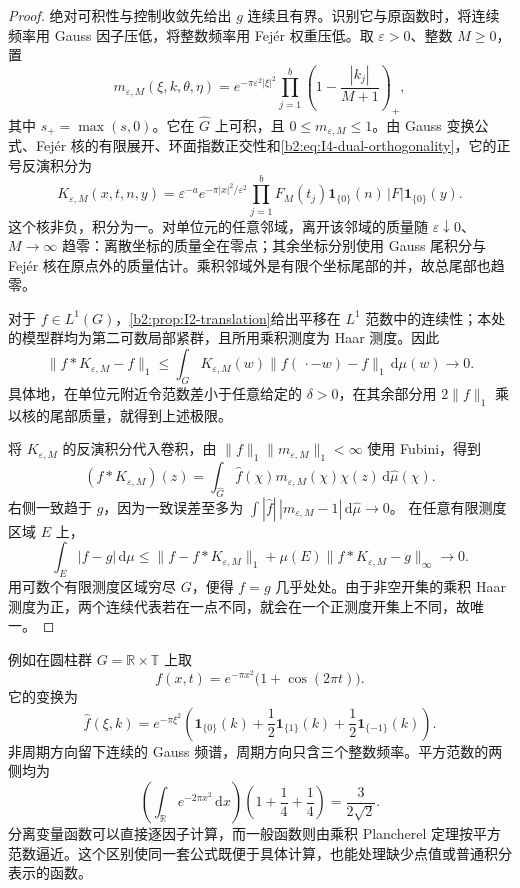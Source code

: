 \begin{proof}
绝对可积性与控制收敛先给出 \(g\) 连续且有界。识别它与原函数时，将连续频率用 Gauss 因子压低，将整数频率用 Fejér 权重压低。取 \(\varepsilon>0\)、整数 \(M\ge0\)，置
\[
 m_{\varepsilon,M}(\xi,k,\theta,\eta)
 =e^{-\pi\varepsilon^2|\xi|^2}
     \prod_{j=1}^b\left(1-\frac{|k_j|}{M+1}\right)_+,
\]
其中 \(s_+=\max(s,0)\)。它在 \(\widehat G\) 上可积，且 \(0\le m_{\varepsilon,M}\le1\)。由 Gauss 变换公式、Fejér 核的有限展开、环面指数正交性和\eqref{b2:eq:I4-dual-orthogonality}，它的正号反演积分为
\[
 K_{\varepsilon,M}(x,t,n,y)
 =\varepsilon^{-a}e^{-\pi|x|^2/\varepsilon^2}
      \prod_{j=1}^bF_M(t_j)
      \mathbf1_{\{0\}}(n)\,|F|\mathbf1_{\{0\}}(y).
\]
这个核非负，积分为一。对单位元的任意邻域，离开该邻域的质量随 \(\varepsilon\downarrow0\)、\(M\to\infty\) 趋零：离散坐标的质量全在零点；其余坐标分别使用 Gauss 尾积分与 Fejér 核在原点外的质量估计。乘积邻域外是有限个坐标尾部的并，故总尾部也趋零。

对于 \(f\in L^1(G)\)，\cref{b2:prop:I2-translation}给出平移在 \(L^1\) 范数中的连续性；本处的模型群均为第二可数局部紧群，且所用乘积测度为 Haar 测度。因此
\[
 \|f*K_{\varepsilon,M}-f\|_1
 \le\int_GK_{\varepsilon,M}(w)\|f(\,\cdot-w)-f\|_1\,\mathrm d\mu(w)
 \longrightarrow0.
\]
具体地，在单位元附近令范数差小于任意给定的 \(\delta>0\)，在其余部分用 \(2\|f\|_1\) 乘以核的尾部质量，就得到上述极限。

将 \(K_{\varepsilon,M}\) 的反演积分代入卷积，由
\(\|f\|_1\|m_{\varepsilon,M}\|_1<\infty\) 使用 Fubini，得到
\[
 (f*K_{\varepsilon,M})(z)
 =\int_{\widehat G}\widehat f(\chi)m_{\varepsilon,M}(\chi)
                         \chi(z)\,\mathrm d\widehat\mu(\chi).
\]
右侧一致趋于 \(g\)，因为一致误差至多为
\(\int|\widehat f|\,|m_{\varepsilon,M}-1|\,\mathrm d\widehat\mu\to0\)。
在任意有限测度区域 \(E\) 上，
\[
 \int_E|f-g|\,\mathrm d\mu
 \le\|f-f*K_{\varepsilon,M}\|_1
       +\mu(E)\|f*K_{\varepsilon,M}-g\|_\infty\longrightarrow0.
\]
用可数个有限测度区域穷尽 \(G\)，便得 \(f=g\) 几乎处处。由于非空开集的乘积 Haar 测度为正，两个连续代表若在一点不同，就会在一个正测度开集上不同，故唯一。
\end{proof}

例如在圆柱群 \(G=\mathbb R\times\mathbb T\) 上取
\[
 f(x,t)=e^{-\pi x^2}\bigl(1+\cos(2\pi t)\bigr).
\]
它的变换为
\[
 \widehat f(\xi,k)=e^{-\pi\xi^2}
 \left(\mathbf1_{\{0\}}(k)+\frac12\mathbf1_{\{1\}}(k)
                         +\frac12\mathbf1_{\{-1\}}(k)\right).
\]
非周期方向留下连续的 Gauss 频谱，周期方向只含三个整数频率。平方范数的两侧均为
\[
 \left(\int_{\mathbb R}e^{-2\pi x^2}\,\mathrm dx\right)
 \left(1+\frac14+\frac14\right)=\frac{3}{2\sqrt2}.
\]
分离变量函数可以直接逐因子计算，而一般函数则由乘积 Plancherel 定理按平方范数逼近。这个区别使同一套公式既便于具体计算，也能处理缺少点值或普通积分表示的函数。
